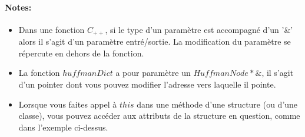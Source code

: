 \documentclass[11pt]{extarticle}
\begin{document}
\paragraph{Notes:} 
\begin{itemize}
\item Dans une fonction $C_{++}$, si le type d'un paramètre est accompagné d'un '\&' alors il s'agit d'un paramètre entré/sortie. La modification du paramètre se répercute en dehors de la fonction.
\item La fonction $huffmanDict$ a pour paramètre un $HuffmanNode*\&$, il s'agit d'un pointer dont vous pouvez modifier l'adresse vers laquelle il pointe.
\item Lorsque vous faites appel à $this$ dans une méthode d'une structure (ou d'une classe), vous pouvez accéder aux attributs de la structure en question, comme dans l'exemple ci-dessus.
\end{itemize}
\end{document}
